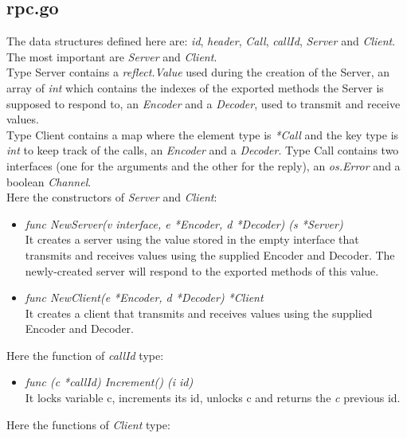 \subsection{rpc.go}

The data structures defined here are: \emph{id}, \emph{header}, \emph{Call}, \emph{callId}, \emph{Server} and \emph{Client}. The most important are \emph{Server} and \emph{Client}.\\
Type Server contains a \emph{reflect.Value} used during the creation of the Server, an array of \emph{int} which contains the indexes of the exported methods the Server is supposed to respond to, an \emph{Encoder} and a \emph{Decoder}, used to transmit and receive values.\\
Type Client contains a map where the element type is \emph{*Call} and the key type is \emph{int} to keep track of the calls, an \emph{Encoder} and a \emph{Decoder}.
Type Call contains two interfaces (one for the arguments and the other for the reply), an \emph{os.Error} and a boolean \emph{Channel}.\\
Here the constructors of \emph{Server} and \emph{Client}:

\begin{itemize}
 
\item \emph{func NewServer(v interface{}, e *Encoder, d *Decoder) (s *Server)}\\
It creates a server using the value stored in the empty interface that transmits and receives values using the supplied Encoder and Decoder. The newly-created server will respond to the exported methods of this value.

\item \emph{func NewClient(e *Encoder, d *Decoder) *Client}\\
It creates a client that transmits and receives values using the supplied Encoder and Decoder.

\end{itemize}
Here the function of \emph{callId} type:

\begin{itemize}

\item \emph{func (c *callId) Increment() (i id)}\\
It locks variable c, increments its id, unlocks c and returns the \emph{c} previous id.  

\end{itemize}
Here the functions of \emph{Client} type:

